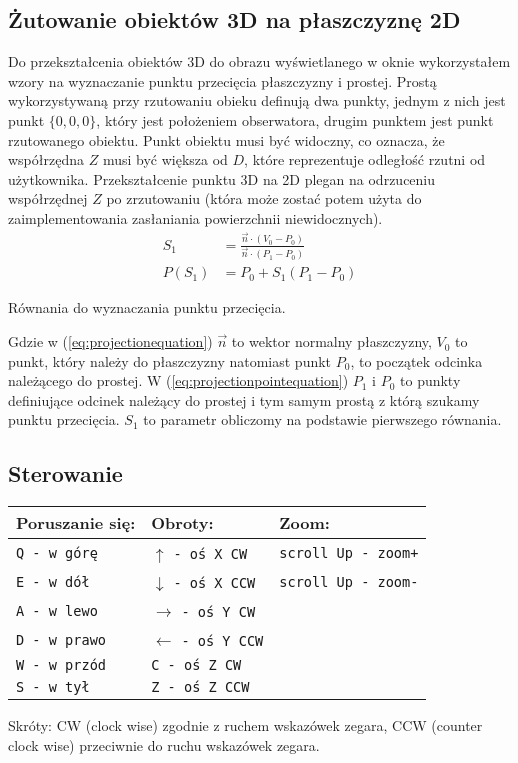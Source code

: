 \documentclass{article}
\begin{document}
\newpage
\subsection{Żutowanie obiektów 3D na płaszczyznę 2D}
Do przekształcenia obiektów 3D do obrazu wyświetlanego w oknie wykorzystałem wzory na wyznaczanie punktu przecięcia płaszczyzny i prostej. Prostą wykorzystywaną przy rzutowaniu obieku definują dwa punkty, jednym z nich jest punkt $\{0,0,0\}$, który jest położeniem obserwatora, drugim punktem jest punkt rzutowanego obiektu. Punkt obiektu musi być widoczny, co oznacza, że współrzędna $Z$ musi być większa od $D$, które reprezentuje odległość rzutni od użytkownika. Przekształcenie punktu 3D na 2D plegan na odrzuceniu współrzędnej $Z$ po zrzutowaniu (która może zostać potem użyta do zaimplementowania zasłaniania powierzchnii niewidocznych).
\begin{subequations}
\begin{align}
S_{1} & = \frac{ \vec{n} \cdot (V_{0} - P_{0}) }{ \vec{n} \cdot (P_{1} - P_{0}) }\label{eq:projectionequation}\\
P(S_{1}) & = P_{0} + S_{1} (P_{1} - P_{0})\label{eq:projectionpointequation}
\end{align}
\end{subequations}
\begin{center}
Równania do wyznaczania punktu przecięcia.
\end{center}

Gdzie w (\ref{eq:projectionequation}) $\vec{n}$ to wektor normalny płaszczyzny, $V_{0}$ to punkt, który należy do płaszczyzny natomiast punkt $P_{0}$, to początek odcinka należącego do prostej.
W (\ref{eq:projectionpointequation}) $P_{1}$ i $P_{0}$ to punkty definiujące odcinek należący do prostej i tym samym prostą z którą szukamy punktu przecięcia. $S_{1}$ to parametr obliczomy na podstawie pierwszego równania.

\subsection{Sterowanie}
\begin{center}
    \begin{tabular}{ | l | l | p{4cm} |}
      \hline
      Poruszanie się: & Obroty: & Zoom:\\
      \hline
      \texttt{Q - w górę} & $\uparrow$ \texttt{- oś X CW} & \texttt{scroll Up - zoom+}\\
      \hline
      \texttt{E - w dół} & $\downarrow$ \texttt{- oś X CCW} & \texttt{scroll Up - zoom-}\\
      \hline
      \texttt{A - w lewo} & $\rightarrow$ \texttt{- oś Y CW} & \\
      \hline
      \texttt{D - w prawo} & $\leftarrow$ \texttt{- oś Y CCW} & \\
      \hline
      \texttt{W - w przód} & \texttt{C - oś Z CW} & \\
      \hline
      \texttt{S - w tył} & \texttt{Z - oś Z CCW} & \\
      \hline
    \end{tabular}
\end{center}
Skróty: CW (clock wise) zgodnie z ruchem wskazówek zegara, CCW (counter clock wise) przeciwnie do ruchu wskazówek zegara.
\end{document}
